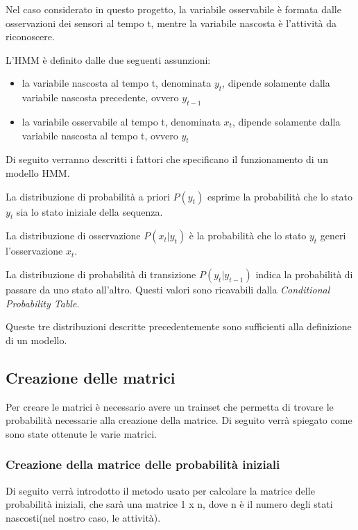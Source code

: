 \documentclass[10pt,a4paper]{article}
\begin{document}
	Nel caso considerato in questo progetto, la variabile osservabile è formata dalle osservazioni dei sensori al tempo t, mentre la variabile nascosta è l'attività da riconoscere.
	
	L'HMM è definito dalle due seguenti assunzioni:
	
	\begin{itemize}
		\item la variabile nascosta al tempo t, denominata $ y_{t} $, dipende solamente dalla variabile nascosta precedente, ovvero $ y_{t - 1} $
		\item la variabile osservabile al tempo t, denominata $ x_{t} $, dipende solamente dalla variabile nascosta al tempo t, ovvero $ y_{t} $
	\end{itemize}
	
	Di seguito verranno descritti i fattori che specificano il funzionamento di un modello HMM.
	
	La distribuzione di probabilità a priori $ P(y_{t}) $ esprime la probabilità che lo stato $ y_{t} $ sia lo stato iniziale della sequenza.
	
	La distribuzione di osservazione $ P(x_{t} | y_{t}) $ è la probabilità che lo stato $ y_{t} $ generi l'osservazione $ x_{t} $.
	
	La distribuzione di probabilità di transizione $ P(y_{t} | y_{t - 1}) $ indica la probabilità di passare da uno stato all'altro. Questi valori sono ricavabili dalla \textit{Conditional Probability Table}.
	
	Queste tre distribuzioni descritte precedentemente sono sufficienti alla definizione di un modello.
	
	\subsection{Creazione delle matrici}
	Per creare le matrici è necessario avere un trainset che permetta di trovare le probabilità necessarie alla creazione della matrice.
	Di seguito verrà spiegato come sono state ottenute le varie matrici.
	
	\subsubsection{Creazione della matrice delle probabilità iniziali}
	Di seguito verrà introdotto il metodo usato per calcolare la matrice delle probabilità iniziali, che sarà una matrice  1 x n, dove n è il numero degli stati nascosti(nel nostro caso, le attività).
	
\end{document}
